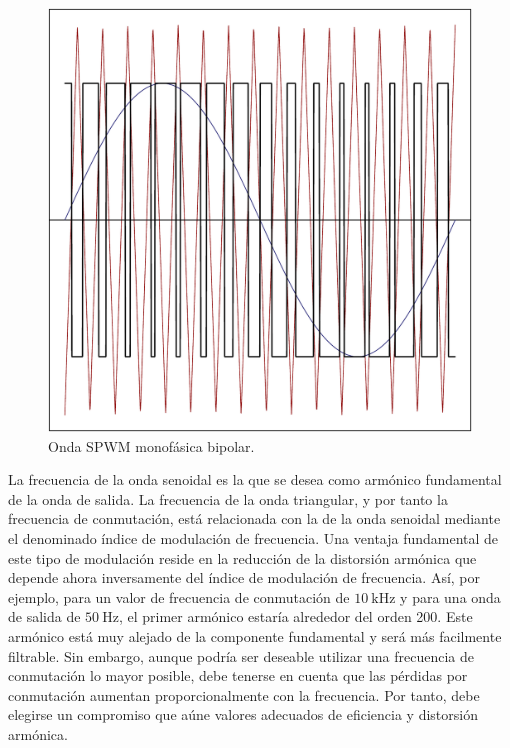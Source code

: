 %
\begin{figure}
\includegraphics[scale=0.6]{../figs/SPWMMonofasico}

\caption{\label{fig:Onda-SPWM-monofasica}Onda SPWM monofásica bipolar.}

\end{figure}


La frecuencia de la onda senoidal es la que se desea como armónico
fundamental de la onda de salida. La frecuencia de la onda triangular,
y por tanto la frecuencia de conmutación, está relacionada con la
de la onda senoidal mediante el denominado índice de modulación de
frecuencia. Una ventaja fundamental de este tipo de modulación reside
en la reducción de la distorsión armónica que depende ahora inversamente
del índice de modulación de frecuencia. Así, por ejemplo, para un
valor de frecuencia de conmutación de $\SI{10}{\kHz}$ y para una
onda de salida de $\SI{50}{\Hz}$, el primer armónico estaría alrededor
del orden 200. Este armónico está muy alejado de la componente fundamental
y será más facilmente filtrable. Sin embargo, aunque podría ser deseable
utilizar una frecuencia de conmutación lo mayor posible, debe tenerse
en cuenta que las pérdidas por conmutación aumentan proporcionalmente
con la frecuencia. Por tanto, debe elegirse un compromiso que aúne
valores adecuados de eficiencia y distorsión armónica. 

